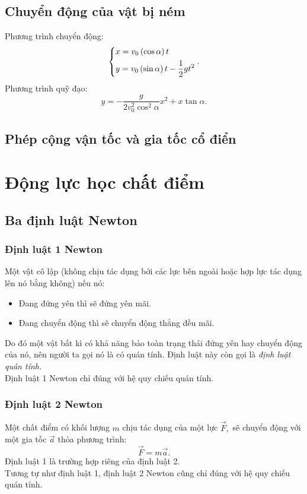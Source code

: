 \section{Chuyển động của vật bị ném}
Phương trình chuyển động:
$$\left\{ \begin{gathered}
  x = {v_0}\left( {\cos \alpha } \right)t \hfill \\
  y = {v_0}\left( {\sin \alpha } \right)t - \frac{1}{2}g{t^2} \hfill \\ 
\end{gathered}  \right..$$
Phương trình quỹ đạo:
$$y =  - \frac{g}{{2v_0^2{{\cos }^2}\alpha }}{x^2} + x\tan \alpha .$$
\section{Phép cộng vận tốc và gia tốc cổ điển}

\chapter{Động lực học chất điểm}
\section{Ba định luật Newton}
\subsection{Định luật 1 Newton}
Một vật cô lập (không chịu tác dụng bởi các lực bên ngoài hoặc hợp lực tác dụng lên nó bằng không) nếu nó:
\begin{itemize}
\item Đang đứng yên thì sẽ đứng yên mãi.
\item Đang chuyển động thì sẽ chuyển động thẳng đều mãi.
\end{itemize}
Do đó một vật bất kì có khả năng bảo toàn trạng thái đứng yên hay chuyển động của nó, nên người ta gọi nó là có quán tính. Định luật này còn gọi là \textit{định luật quán tính.}\\
Định luật 1 Newton chỉ đúng với hệ quy chiếu quán tính.
\subsection{Định luật 2 Newton}
Một chất điểm có khối lượng $m$ chịu tác dụng của một lực $\overrightarrow{F},$ sẽ chuyển động với một gia tốc $\overrightarrow{a}$ thỏa phương trình:
$$\overrightarrow{F} = m \overrightarrow{a}.$$
Định luật 1 là trường hợp riêng của định luật 2.\\
Tương tự như định luật 1, định luật 2 Newton cũng chỉ đúng với hệ quy chiếu quán tính. 
